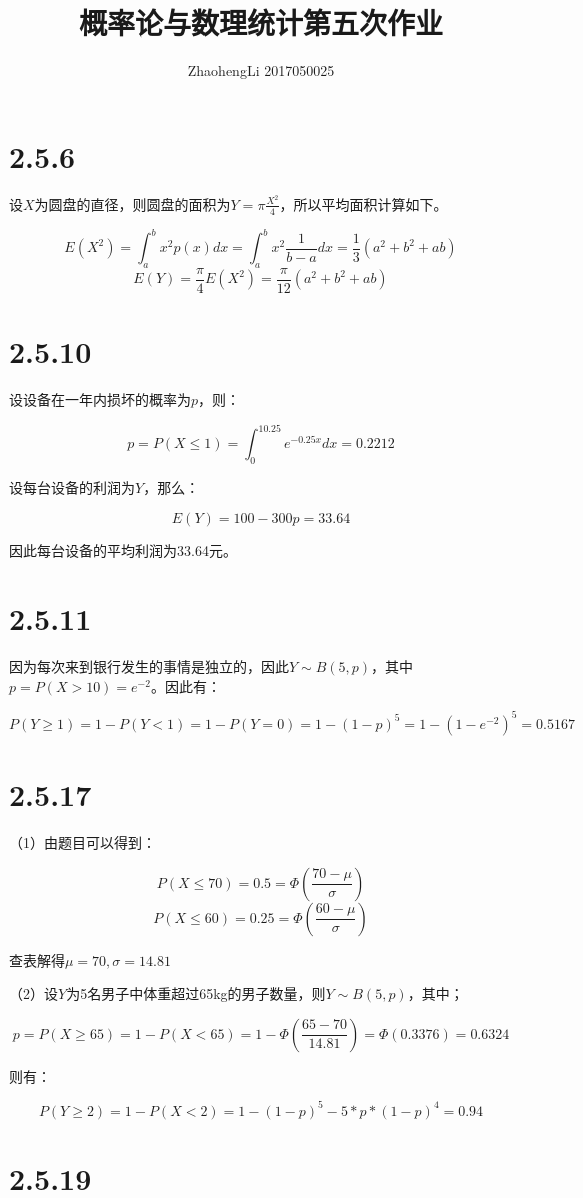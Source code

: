\documentclass{article}
\title{概率论与数理统计第五次作业}
\author{ZhaohengLi 2017050025}
\begin{document}
\maketitle

\section{2.5.6}
设$X$为圆盘的直径，则圆盘的面积为$Y=\pi \frac{X^2}{4}$，所以平均面积计算如下。

$$E(X^2)=\int_a^bx^2p(x)dx=\int_a^bx^2\frac{1}{b-a}dx=\frac{1}{3}(a^2+b^2+ab)$$
$$E(Y)=\frac{\pi}{4}E(X^2)=\frac{\pi}{12}(a^2+b^2+ab)$$

\section{2.5.10}
设设备在一年内损坏的概率为$p$，则：

$$p=P(X\leq 1)=\int_0^10.25e^{-0.25x}dx=0.2212$$

设每台设备的利润为$Y$，那么：

$$E(Y)=100-300p=33.64$$

因此每台设备的平均利润为33.64元。

\section{2.5.11}
因为每次来到银行发生的事情是独立的，因此$Y\sim B(5,p)$，其中$p=P(X>10)=e^{-2}$。因此有：

$$P(Y\geq 1)=1-P(Y<1)=1-P(Y=0)=1-(1-p)^5=1-(1-e^{-2})^5=0.5167$$

\section{2.5.17}
（1）由题目可以得到：

$$P(X\leq 70)=0.5=\Phi (\frac{70-\mu}{\sigma})$$
$$P(X\leq 60)=0.25=\Phi (\frac{60-\mu}{\sigma})$$

查表解得$\mu = 70,\sigma = 14.81$


（2）设$Y$为5名男子中体重超过65kg的男子数量，则$Y\sim B(5,p)$，其中；

$$p=P(X\geq65)=1-P(X<65)=1-\Phi(\frac{65-70}{14.81})=\Phi(0.3376)=0.6324$$

则有：

$$P(Y\geq2)=1-P(X<2)=1-(1-p)^5-5*p*(1-p)^4=0.94$$

\section{2.5.19}
\end{document}
